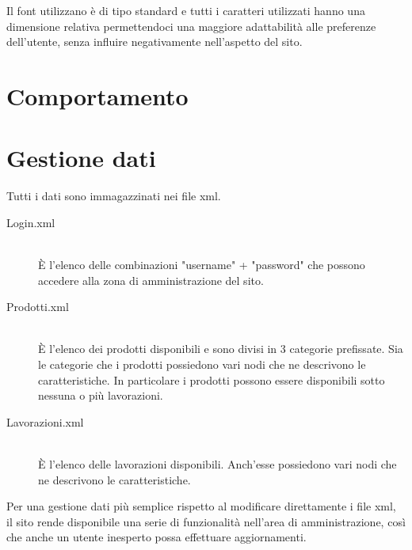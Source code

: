 \documentclass[11pt]{article}
\begin{document}
Il font utilizzano è di tipo standard e tutti i caratteri utilizzati hanno una dimensione relativa permettendoci una maggiore adattabilità alle preferenze dell'utente, senza influire negativamente nell'aspetto del sito.
\newpage
\section{Comportamento}
\newpage
\section{Gestione dati}
Tutti i dati sono immagazzinati nei file xml.
\begin{description}
	\item[Login.xml]\hfill \\
	È l'elenco delle combinazioni "username" + "password" che possono accedere alla zona di amministrazione del sito.
	\item[Prodotti.xml] \hfill\\È l'elenco dei prodotti disponibili e sono divisi in 3 categorie prefissate. Sia le categorie che i prodotti possiedono vari nodi che ne descrivono le caratteristiche. In particolare i prodotti possono essere disponibili sotto nessuna o più lavorazioni.
	\item[Lavorazioni.xml]\hfill \\ È l'elenco delle lavorazioni disponibili. Anch'esse possiedono vari nodi che ne descrivono le caratteristiche.
\end{description}
Per una gestione dati più semplice rispetto al modificare direttamente i file xml, il sito rende disponibile una serie di funzionalità nell'area di amministrazione, così che anche un utente inesperto possa effettuare aggiornamenti.
\newpage
\end{document}
